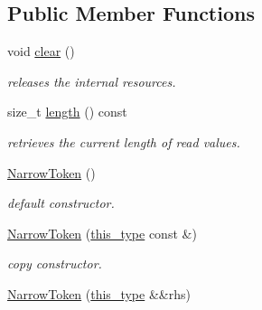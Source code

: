 \subsection*{Public Member Functions}
\begin{DoxyCompactItemize}
\item 
\hypertarget{classhryky_1_1_narrow_token_a85f5dc5a4b422c3251139e60cf7fef0d}{void \hyperlink{classhryky_1_1_narrow_token_a85f5dc5a4b422c3251139e60cf7fef0d}{clear} ()}\label{classhryky_1_1_narrow_token_a85f5dc5a4b422c3251139e60cf7fef0d}

\begin{DoxyCompactList}\small\item\em releases the internal resources. \end{DoxyCompactList}\item 
\hypertarget{classhryky_1_1_narrow_token_a1d27594be3e660ad6a085bf7e7f4d980}{size\-\_\-t \hyperlink{classhryky_1_1_narrow_token_a1d27594be3e660ad6a085bf7e7f4d980}{length} () const }\label{classhryky_1_1_narrow_token_a1d27594be3e660ad6a085bf7e7f4d980}

\begin{DoxyCompactList}\small\item\em retrieves the current length of read values. \end{DoxyCompactList}\item 
\hypertarget{classhryky_1_1_narrow_token_a1ce8a8fce4830b8bdb73f9a4bb22a6ad}{\hyperlink{classhryky_1_1_narrow_token_a1ce8a8fce4830b8bdb73f9a4bb22a6ad}{Narrow\-Token} ()}\label{classhryky_1_1_narrow_token_a1ce8a8fce4830b8bdb73f9a4bb22a6ad}

\begin{DoxyCompactList}\small\item\em default constructor. \end{DoxyCompactList}\item 
\hypertarget{classhryky_1_1_narrow_token_ad60e6cb2513b59434f85506aefd4db63}{\hyperlink{classhryky_1_1_narrow_token_ad60e6cb2513b59434f85506aefd4db63}{Narrow\-Token} (\hyperlink{classhryky_1_1_narrow_token_a8ef24a463e656c6201d12dc48d566c58}{this\-\_\-type} const \&)}\label{classhryky_1_1_narrow_token_ad60e6cb2513b59434f85506aefd4db63}

\begin{DoxyCompactList}\small\item\em copy constructor. \end{DoxyCompactList}\item 
\hypertarget{classhryky_1_1_narrow_token_a708b7d695e675848be5e8f871a61ce3f}{\hyperlink{classhryky_1_1_narrow_token_a708b7d695e675848be5e8f871a61ce3f}{Narrow\-Token} (\hyperlink{classhryky_1_1_narrow_token_a8ef24a463e656c6201d12dc48d566c58}{this\-\_\-type} \&\&rhs)}\label{classhryky_1_1_narrow_token_a708b7d695e675848be5e8f871a61ce3f}


\end{DoxyCompactItemize}
